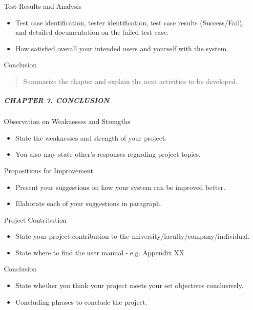 Test Results and Analysis

\begin{itemize}
\item
  Test case identification, tester identification, test case results
  (Success/Fail), and detailed documentation on the failed test case.
\item
  How satisfied overall your intended users and yourself with the
  system.
\end{itemize}

Conclusion

\begin{quote}
Summarize the chapter and explain the next activities to be developed.
\end{quote}

\subparagraph{CHAPTER 7. CONCLUSION}\label{chapter-7.-conclusion}

Observation on Weaknesses and Strengths

\begin{itemize}
\item
  State the weaknesses and strength of your project.
\item
  You also may state other's responses regarding project topics.
\end{itemize}

Propositions for Improvement

\begin{itemize}
\item
  Present your suggestions on how your system can be improved better.
\item
  Elaborate each of your suggestions in paragraph.
\end{itemize}

Project Contribution

\begin{itemize}
\item
  State your project contribution to the
  university/faculty/company/individual.
\item
  State where to find the user manual - e.g. Appendix XX
\end{itemize}

Conclusion

\begin{itemize}
\item
  State whether you think your project meets your set objectives
  conclusively.
\item
  Concluding phrases to conclude the project.
\end{itemize}

